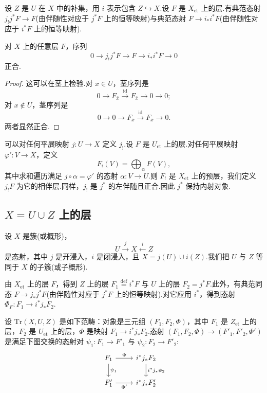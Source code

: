 设 $Z$ 是 $U$ 在 $X$ 中的补集，用 $i$ 表示包含 $Z \hookrightarrow X$.设 $F$ 是 $X_{\mathrm{et}}$ 上的层.有典范态射 $j_{!}j^{*}F \to F$(由伴随性对应于 $j^{*}F$ 上的恒等映射)与典范态射 $F \to i_{*}i^{*}F$(由伴随性对应于 $i^{*}F$ 上的恒等映射).

\begin{proposition}\label{prop:8.15}
对 $X$ 上的任意层 $F$，序列
\[
0 \to j_{!}j^{*}F \to F \to i_{*}i^{*}F \to 0
\]
正合.
\end{proposition}

\begin{proof}
这可以在茎上检验.对 $x \in U$，茎序列是
\[
0 \to F_{\bar{x}} \xrightarrow{\mathrm{id}} F_{\bar{x}} \to 0 \to 0;
\]
对 $x \notin U$，茎序列是
\[
0 \to 0 \to F_{\bar{x}} \xrightarrow{\mathrm{id}} F_{\bar{x}} \to 0.
\]
两者显然正合.
\end{proof}

\begin{remark}\label{rem:8.16}
可以对任何平展映射 $j \colon U \to X$ 定义 $j_{!}$.设 $F$ 是 $U_{\mathrm{et}}$ 上的层.对任何平展映射 $\varphi' \colon V \to X$，定义
\[
F_{!}(V) = \bigoplus_{\alpha} F(V),
\]
其中求和遍历满足 $j \circ \alpha = \varphi'$ 的态射 $\alpha \colon V \to U$.则 $F_{!}$ 是 $X_{\mathrm{et}}$ 上的预层，我们定义 $j_{!}F$ 为它的相伴层.同样，$j_{!}$ 是 $j^{*}$ 的左伴随且正合.因此 $j^{*}$ 保持内射对象.
\end{remark}

\subsection*{\texorpdfstring{$X = U \cup Z$ 上的层}{X = U ∪ Z 上的层}}

设 $X$ 是簇(或概形)，
\[
U \xrightarrow{j} X \xleftarrow{i} Z
\]
是态射，其中 $j$ 是开浸入，$i$ 是闭浸入，且 $X = j(U) \cup i(Z)$.我们把 $U$ 与 $Z$ 等同于 $X$ 的子簇(或子概形).

由 $X_{\mathrm{et}}$ 上的层 $F$，得到 $Z$ 上的层 $F_1 \overset{\mathrm{def}}{=} i^{*}F$ 与 $U$ 上的层 $F_2 = j^{*}F$.此外，有典范同态 $F \to j_{*}j^{*}F$(由伴随性对应于 $j^{*}F$ 上的恒等映射).对它应用 $i^{*}$，得到态射 $\Phi_F \colon F_1 \to i^{*}j_{*}F_2$.

设 $\mathrm{Tr}(X, U, Z)$ 是如下范畴：对象是三元组 $(F_1, F_2, \Phi)$，其中 $F_1$ 是 $Z_{\mathrm{et}}$ 上的层，$F_2$ 是 $U_{\mathrm{et}}$ 上的层，$\Phi$ 是映射 $F_1 \to i^{*}j_{*}F_2$.态射 $(F_1, F_2, \Phi) \to (F'_1, F'_2, \Phi')$ 是满足下图交换的态射对 $\psi_1 \colon F_1 \to F'_1$ 与 $\psi_2 \colon F_2 \to F'_2$:
\[
\begin{tikzcd}
F_1 \arrow[r, "\Phi"] \arrow[d, "\psi_1"] & i^{*}j_{*}F_2 \arrow[d, "i^{*}j_{*}\psi_2"] \\
F'_1 \arrow[r, "\Phi'"'] & i^{*}j_{*}F'_2
\end{tikzcd}
\]

